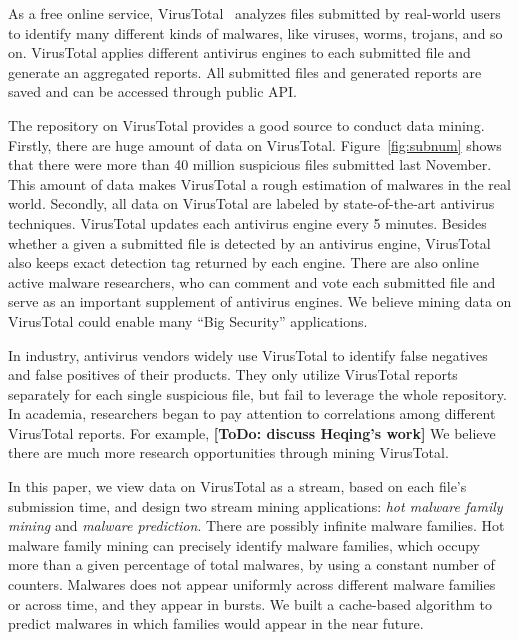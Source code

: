 
As a free online service, VirusTotal~\cite{virustotal} analyzes files submitted by real-world users to identify many different kinds of malwares, 
like viruses, worms, trojans, and so on. 
VirusTotal applies different antivirus engines to each submitted file and generate an aggregated reports. 
All submitted files and generated reports are saved and can be accessed through public API. 

The repository on VirusTotal provides a good source to conduct data mining. 
Firstly, there are huge amount of data on VirusTotal.
Figure~\ref{fig:subnum} shows that there were more than 40 million suspicious files 
submitted last November. 
This amount of data makes VirusTotal a rough estimation of malwares in the real world. 
Secondly, all data on VirusTotal are labeled by state-of-the-art antivirus techniques. 
VirusTotal updates each antivirus engine every 5 minutes. 
Besides whether a given a submitted file is detected by an antivirus engine, VirusTotal also keeps exact detection tag returned by each engine. 
There are also online active malware researchers, 
who can comment and vote each submitted file and serve as an important supplement of antivirus engines. 
We believe mining data on VirusTotal could enable many ``Big Security'' applications. 

In industry, antivirus vendors widely use VirusTotal to identify false negatives and false positives of their products. 
They only utilize VirusTotal reports separately for each single suspicious file, but fail to leverage the whole repository. 
In academia, researchers began to pay attention to correlations among different VirusTotal reports. 
For example, {\bf [ToDo: discuss Heqing's work]}
We believe there are much more research opportunities through mining VirusTotal. 

In this paper, we view data on VirusTotal as a stream, based on each file’s submission time, and design two stream mining applications: 
\textit{hot malware family mining} and \textit{malware prediction}. 
There are possibly infinite malware families. 
Hot malware family mining can precisely identify malware families, 
which occupy more than a given percentage of total malwares, by using a constant number of counters.
Malwares does not appear uniformly across different malware families or across time, 
and they appear in bursts. 
We built a cache-based algorithm to predict malwares in which families would appear in the near future. 

